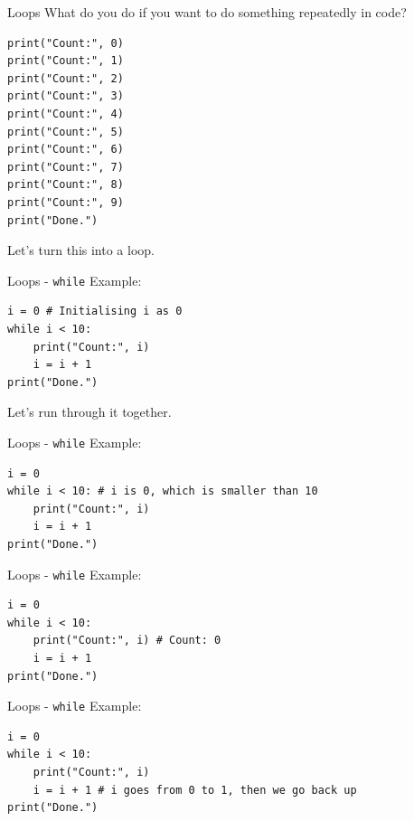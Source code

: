 \documentclass[dvipsnames, svgnames, x11names]{beamer}
\begin{document}
\begin{frame}[fragile]{Loops}
What do you do if you want to do something repeatedly in code? \pause 
\begin{verbatim}
print("Count:", 0)
print("Count:", 1)
print("Count:", 2)
print("Count:", 3)
print("Count:", 4)
print("Count:", 5)
print("Count:", 6)
print("Count:", 7)
print("Count:", 8)
print("Count:", 9)
print("Done.")
\end{verbatim} 
\pause 
Let's turn this into a loop.
\end{frame}

\begin{frame}[fragile]{Loops - \texttt{while}}
Example:
\begin{verbatim}
i = 0 # Initialising i as 0
while i < 10:
    print("Count:", i)
    i = i + 1
print("Done.")
\end{verbatim}
Let's run through it together.
\end{frame}

\addtocounter{framenumber}{-1}

\begin{frame}[fragile]{Loops - \texttt{while}}
Example:
\begin{verbatim}
i = 0
while i < 10: # i is 0, which is smaller than 10
    print("Count:", i)
    i = i + 1
print("Done.")
\end{verbatim}
\end{frame}

\addtocounter{framenumber}{-1}

\begin{frame}[fragile]{Loops - \texttt{while}}
Example:
\begin{verbatim}
i = 0
while i < 10: 
    print("Count:", i) # Count: 0
    i = i + 1
print("Done.")
\end{verbatim}
\end{frame}

\addtocounter{framenumber}{-1}

\begin{frame}[fragile]{Loops - \texttt{while}}
Example:
\begin{verbatim}
i = 0
while i < 10: 
    print("Count:", i)
    i = i + 1 # i goes from 0 to 1, then we go back up
print("Done.")
\end{verbatim}
\end{frame}

\addtocounter{framenumber}{-1}
\end{document}
